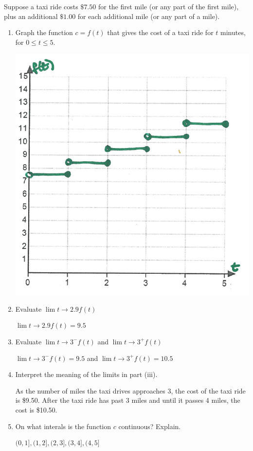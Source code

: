 \documentclass[nooutcomes]{ximera}
\begin{document}
\begin{problem}
Suppose a taxi ride costs $\$7.50$ for the first mile (or any part of the first mile), plus an additional $\$1.00$ for each additional mile (or any part of a mile).
\begin{enumerate}
	\item Graph the function $c=f(t)$ that gives the cost of a taxi ride for $t$ minutes, for $0 \le t \le 5$.
		\begin{freeResponse} \hfil
	\begin{image}
	\includegraphics[scale=.5]{Figure5.png}
	\end{image}
		\end{freeResponse}

	\item Evaluate $\lim{t \to 2.9}f(t)$
		\begin{freeResponse}
$\lim{t \to 2.9}f(t)=9.5$
		\end{freeResponse}
	\item Evaluate $\lim{t \to 3^-}f(t)$ and $\lim{t \to 3^+}f(t)$		
		\begin{freeResponse}
$\lim{t \to 3^-}f(t)=9.5$ and $\lim{t \to 3^+}f(t)=10.5$	
		\end{freeResponse}
	\item Interpret the meaning of the limits in part (iii).
		\begin{freeResponse}
As the number of miles the taxi drives approaches 3, the cost of the taxi ride is \$9.50.  After the taxi ride has past 3 miles and until it passes 4 miles, the cost is \$10.50.
		\end{freeResponse}
	\item On what interals is the function $c$ continuous?  Explain.
		\begin{freeResponse}
			$(0,1],(1,2],(2,3],(3,4],(4,5]$
		\end{freeResponse}
\end{enumerate}
\end{problem}
\end{document}
